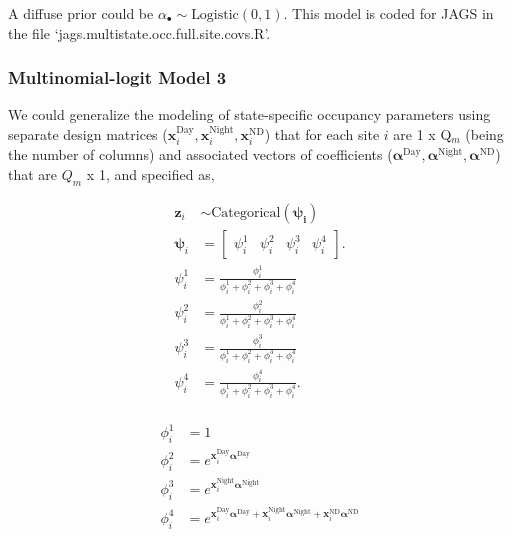 \documentclass[12pt]{article}
\begin{document}
A diffuse prior could be $\alpha_{\bullet} \sim \text{Logistic}(0,1).$ This model is coded for JAGS in the file `jags.multistate.occ.full.site.covs.R'.

\subsubsection{Multinomial-logit Model 3}
We could generalize the modeling of state-specific occupancy parameters using separate design matrices ($\textbf{x}_{i}^{\text{Day}}, \textbf{x}_{i}^{\text{Night}}, \textbf{x}_{i}^{\text{ND}}$) that for each site $i$ are  1 x Q$_{m}$ (being the number of columns) and associated vectors of coefficients ($\boldsymbol{\alpha}^{\text{Day}}, \boldsymbol{\alpha}^{\text{Night}}, \boldsymbol{\alpha}^{\text{ND}}$) that are $Q_{m}$ x 1, and specified as,
\begin{center}
\begin{align*}
\textbf{z}_{i} &\sim \text{Categorical}(\boldsymbol{\psi_{i}})\\
\boldsymbol{\psi}_{i} &= \begin{bmatrix} \psi^1_{i} & \psi^2_{i} & \psi^3_{i} & \psi^4_{i} \end{bmatrix}.\\
\psi^1_{i} &=\frac{\phi^1_{i}}{\phi^1_{i}+ \phi^2_{i}+\phi^3_{i}+\phi^4_{i}}\\
\psi^2_{i} &=\frac{\phi^2_{i}}{\phi^1_{i}+ \phi^2_{i}+\phi^3_{i}+\phi^4_{i}}\\
\psi^3_{i} &=\frac{\phi^3_{i}}{\phi^1_{i}+ \phi^2_{i}+\phi^3_{i}+\phi^4_{i}}\\
\psi^4_{i} &=\frac{\phi^4_{i}}{\phi^1_{i}+ \phi^2_{i}+\phi^3_{i}+\phi^4_{i}}.\\
\end{align*}
\end{center}

\begin{center}
\begin{align*}
\phi^1_{i} &= 1\\
\phi^2_{i} &= e^{\textbf{x}_{i}^{\text{Day}}\boldsymbol{\alpha}^{\text{Day}}}\\
\phi^3_{i} &= e^{\textbf{x}_{i}^{\text{Night}}\boldsymbol{\alpha}^{\text{Night}}}\\
\phi^4_{i} &= e^{\textbf{x}_{i}^{\text{Day}}\boldsymbol{\alpha}^{\text{Day}}+\textbf{x}_{i}^{\text{Night}}\boldsymbol{\alpha}^{\text{Night}}+\textbf{x}_{i}^{\text{ND}}\boldsymbol{\alpha}^{\text{ND}}}\\
\end{align*}
\end{center}
\end{document}
